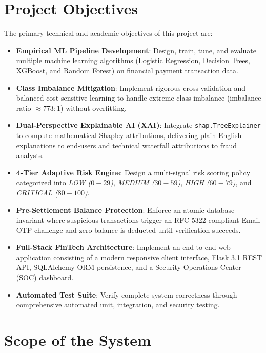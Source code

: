 \section{Project Objectives}
The primary technical and academic objectives of this project are:
\begin{itemize}
    \item \textbf{Empirical ML Pipeline Development}: Design, train, tune, and evaluate multiple machine learning algorithms (Logistic Regression, Decision Trees, XGBoost, and Random Forest) on financial payment transaction data.
    \item \textbf{Class Imbalance Mitigation}: Implement rigorous cross-validation and balanced cost-sensitive learning to handle extreme class imbalance (imbalance ratio $\approx 773:1$) without overfitting.
    \item \textbf{Dual-Perspective Explainable AI (XAI)}: Integrate \texttt{shap.TreeExplainer} to compute mathematical Shapley attributions, delivering plain-English explanations to end-users and technical waterfall attributions to fraud analysts.
    \item \textbf{4-Tier Adaptive Risk Engine}: Design a multi-signal risk scoring policy categorized into \textit{LOW ($0-29$)}, \textit{MEDIUM ($30-59$)}, \textit{HIGH ($60-79$)}, and \textit{CRITICAL ($80-100$)}.
    \item \textbf{Pre-Settlement Balance Protection}: Enforce an atomic database invariant where suspicious transactions trigger an RFC-5322 compliant Email OTP challenge and zero balance is deducted until verification succeeds.
    \item \textbf{Full-Stack FinTech Architecture}: Implement an end-to-end web application consisting of a modern responsive client interface, Flask 3.1 REST API, SQLAlchemy ORM persistence, and a Security Operations Center (SOC) dashboard.
    \item \textbf{Automated Test Suite}: Verify complete system correctness through comprehensive automated unit, integration, and security testing.
\end{itemize}

\section{Scope of the System}
